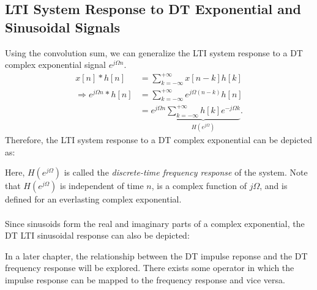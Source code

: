 \documentclass{report}
\begin{document}
\subsection{LTI System Response to DT Exponential and Sinusoidal Signals}
Using the convolution sum, we can generalize the LTI system response to a DT complex exponential signal $e^{j\Omega n}$.
\begin{align*}
    x[n] * h[n] &= \sum_{k=-\infty}^{+\infty} x[n-k]h[k] \\
    \Longrightarrow e^{j\Omega n} * h[n] &= \sum_{k=-\infty}^{+\infty} e^{j\Omega (n-k)}h[n] \\
    &= e^{j\Omega n} \underbrace{\sum_{k=-\infty}^{+\infty} h[k]e^{-j\Omega k} }_\textrm{$H(e^{j\Omega})$}.
\end{align*}
Therefore, the LTI system response to a DT complex exponential can be depicted as: 
\begin{center}
\end{center}
Here, $H(e^{j\Omega})$ is called the \emph{discrete-time frequency response} of the system. Note that $H(e^{j\Omega})$ is independent of time $n$, 
is a complex function of $j\Omega$, and is defined for an everlasting complex exponential. 
\\ \\
Since sinusoids form the real and imaginary parts of a complex exponential, the DT LTI sinusoidal response can also be depicted: 
\begin{center}
\end{center}
In a later chapter, the relationship between the DT impulse reponse and the DT frequency response will be explored. There exists some operator in which the impulse response can be 
mapped to the frequency response and vice versa.
\end{document}
